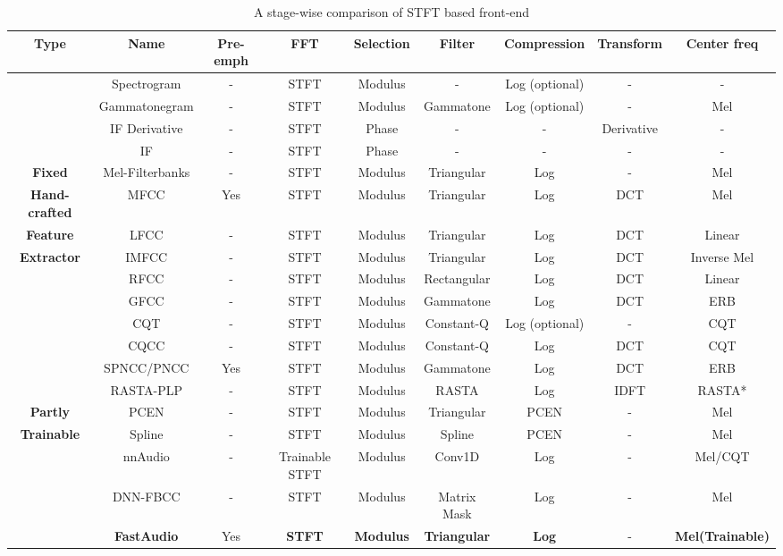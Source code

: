 \documentclass[conference]{IEEEtran}
\begin{document}
\begin{table*}[hbt!]
\caption{\label{table:stftfrontend}A stage-wise comparison of STFT based front-end}
\begin{center}
\begin{tabular}{|c|c|c|c|c|c|c|c|c|}
\hline
\textbf {Type} & \textbf{Name} & \textbf{Pre-emph} & \textbf{FFT} & \textbf{Selection} & \textbf{Filter} & \textbf{Compression} &\textbf{Transform} & \textbf{Center freq}\\
\hline
\textbf  & Spectrogram & - & STFT & Modulus & - & Log (optional) & - &-\\
\cline{2-9} 
\textbf  & Gammatonegram &  - & STFT & Modulus & Gammatone & Log (optional) & - &Mel\\
\cline{2-9} 
\textbf  & IF Derivative &  - & STFT & Phase & - & - & Derivative & -\\
\cline{2-9} 
\textbf  & IF &  - & STFT & Phase & - & - & - & -\\
\cline{2-9} 
\textbf {Fixed} & Mel-Filterbanks &  - & STFT & Modulus & Triangular & Log & - & Mel\\
\cline{2-9} 
\textbf {Hand-crafted} & MFCC &  Yes & STFT & Modulus & Triangular & Log & DCT & Mel\\
\cline{2-9} 
\textbf {Feature} & LFCC &  - & STFT & Modulus & Triangular &  Log & DCT & Linear\\
\cline{2-9} 
\textbf {Extractor} & IMFCC &  - & STFT & Modulus & Triangular &  Log & DCT & Inverse Mel\\
\cline{2-9} 
 & RFCC &  - & STFT & Modulus & Rectangular &  Log & DCT & Linear\\
\cline{2-9} 
 & GFCC &  - & STFT & Modulus & Gammatone &  Log & DCT & ERB\\
\cline{2-9} 
\textbf  & CQT &  - & STFT & Modulus & Constant-Q & Log (optional) & - & CQT\\
\cline{2-9} 
\textbf  & CQCC &  - & STFT & Modulus & Constant-Q & Log & DCT & CQT\\
\cline{2-9} 
\textbf  & SPNCC/PNCC &  Yes  & STFT & Modulus & Gammatone & Log & DCT & ERB \\
\cline{2-9} 
\textbf  & RASTA-PLP &  -  & STFT & Modulus & RASTA & Log & IDFT & RASTA*\\
\hline
\textbf {Partly} & PCEN &  -  & STFT & Modulus & Triangular & PCEN & - & Mel\\
\cline{2-9} 
\textbf {Trainable} & Spline &  -  & STFT & Modulus & Spline & PCEN & - & Mel\\
\cline{2-9} 
\textbf  & nnAudio &  -  & Trainable STFT & Modulus & Conv1D & Log & - & Mel/CQT\\
\cline{2-9} 
\textbf  & DNN-FBCC &  -  & STFT & Modulus & Matrix Mask & Log & - & Mel\\
\cline{2-9} 
 & \textbf{FastAudio} &  Yes & \textbf{STFT} & \textbf{Modulus} & \textbf{Triangular} & \textbf{Log} & - & \textbf{Mel(Trainable)}\\
\hline
\end{tabular}
\end{center}
\end{table*}
\end{document}
